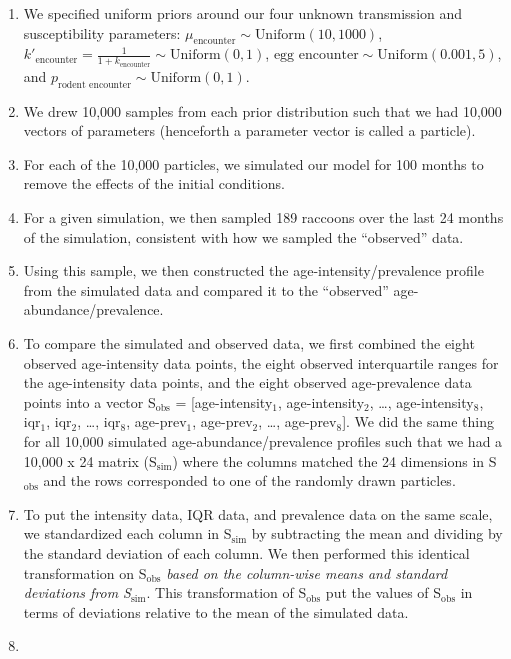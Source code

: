 \documentclass[11pt]{article}
\begin{document}
\begin{enumerate}
\def\labelenumi{\arabic{enumi}.}
\item
  We specified uniform priors around our four unknown transmission and
  susceptibility parameters: $\mu_{\text{encounter}} \sim \text{Uniform}(10, 1000)$, $k'_{\text{encounter}} = \frac{1}{1 + k_{\text{encounter}}} \sim \text{Uniform}(0, 1)$, $\text{egg encounter} \sim \text{Uniform}(0.001, 5)$, and $p_{\text{rodent encounter}} \sim \text{Uniform}(0, 1)$.
\item
  We drew 10,000 samples from each prior distribution such that we had
  10,000 vectors of parameters (henceforth a parameter vector is called a particle).
\item
  For each of the 10,000 particles, we simulated our model for 100
  months to remove the effects of the initial conditions.
\item
  For a given simulation, we then sampled 189 raccoons over the last 24
  months of the simulation, consistent with how we sampled the ``observed'' data.
\item
  Using this sample, we then constructed the age-intensity/prevalence
  profile from the simulated data and compared it to the ``observed'' age-
  abundance/prevalence.
\item
  To compare the simulated and observed data, we first combined the
  eight observed age-intensity data points, the eight observed interquartile ranges for the age-intensity data points, and the eight observed
  age-prevalence data points into a vector S$_\text{obs}$ = [age-intensity$_1$,
  age-intensity$_2$, \ldots{}, age-intensity$_8$, iqr$_1$, iqr$_2$, \ldots{}, iqr$_8$, age-prev$_1$,
  age-prev$_2$, \ldots{}, age-prev$_8$]. We did the same thing for all
  10,000 simulated age-abundance/prevalence profiles such that we had a
  10,000 x 24 matrix (S$_\text{sim}$) where the columns matched the 24 dimensions
  in S$_\text{obs}$ and the rows corresponded to one of the randomly drawn
  particles.
\item
  To put the intensity data, IQR data, and prevalence data on the same
  scale, we standardized each column in S$_\text{sim}$ by subtracting the mean
  and dividing by the standard deviation of each column. We then
  performed this identical transformation on S$_\text{obs}$ \emph{based on the
  column-wise means and standard deviations from S$_\text{sim}$}. This
  transformation of S$_\text{obs}$ put the values of S$_\text{obs}$ in terms of
  deviations relative to the mean of the simulated data.
\item

\end{enumerate}
\end{document}
